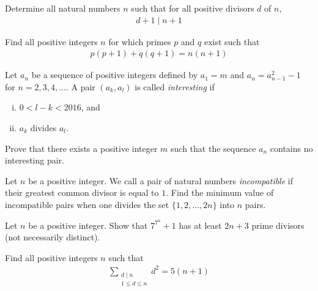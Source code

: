 \documentclass[problems.tex]{subfile}
\begin{document}
	\begin{problem}
		Determine all natural numbers $n$ such that for all positive divisors $d$ of $n$,
		\begin{align*}
			d + 1 \mid n + 1
		\end{align*}
	\end{problem}

	\begin{problem}
		Find all positive integers $n$ for which primes $p$ and $q$ exist such that
		\begin{align*}
			p(p+1) + q(q+1) = n(n+1)
		\end{align*}
	\end{problem}

	\begin{problem}
		Let $a_n$ be a sequence of positive integers defined by $a_1 = m$ and $a_{n} = a_{n-1}^2 - 1$ for $n= 2, 3, 4, \dots$. A pair $(a_k, a_l)$ is called \textit{interesting} if
		\begin{enumerate}[(i)]
			\item $0 < l - k < 2016$, and
			\item $a_k$ divides $a_l$.
		\end{enumerate}
		Prove that there exists a positive integer $m$ such that the sequence $a_n$ contains no interesting pair.
	\end{problem}

	\begin{problem}
		Let $n$ be a positive integer. We call a pair of natural numbers \textit{incompatible} if their greatest common divisor is equal to $1$. Find the minimum value of incompatible pairs when one divides the set $\{1,2,\dots,2n\}$ into $n$ pairs.
	\end{problem}

	\begin{problem}
		Let $n$ be a positive integer. Show that $7^{7^n} + 1$ has at least $2n + 3$ prime divisors (not necessarily distinct).
	\end{problem}

	\begin{problem}
		Find all positive integers $n$ such that
		\begin{align*}
			\sum_{\substack{d \mid n \\ 1 \leq d \leq n}} d^2 = 5(n+1)
		\end{align*}
	\end{problem}
\end{document}
